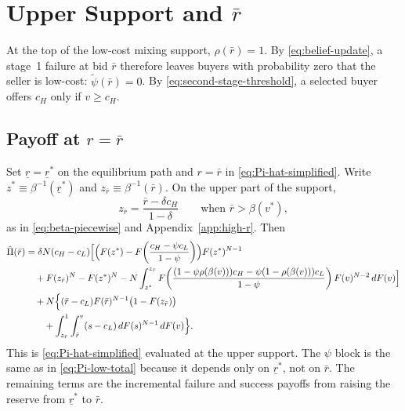 \section{Upper Support and \texorpdfstring{$\bar{r}$}{r bar}}
\label{sec:upper-support}

At the top of the low-cost mixing support, $\rho(\bar{r})=1$.
By \eqref{eq:belief-update}, a stage~1 failure at bid $\bar{r}$ therefore leaves
buyers with probability zero that the seller is low-cost:
$\tilde{\psi}(\bar{r})=0$.
By \eqref{eq:second-stage-threshold}, a selected buyer offers $c_H$ only if
$v\ge c_H$.

\subsection{Payoff at \texorpdfstring{$r=\bar{r}$}{r=bar r}}
\label{subsec:Pi-hat-bar}

Set $\underline{r}=\underline{r}^{*}$ on the equilibrium path and $r=\bar{r}$
in \eqref{eq:Pi-hat-simplified}.
Write
$z^{*}\equiv\beta^{-1}(\underline{r}^{*})$
and
$z_{\bar{r}}\equiv\beta^{-1}(\bar{r})$.
On the upper part of the support,
\begin{equation}
  z_{\bar{r}}
  = \frac{\bar{r}-\delta c_H}{1-\delta}
  \qquad\text{when }\bar{r}>\beta(v^{*}),
  \label{eq:z-bar}
\end{equation}
as in \eqref{eq:beta-piecewise} and Appendix~\ref{app:high-r}.
Then
\begin{align}
  \hat{\Pi}(\bar{r})
  &= \delta N (c_H - c_L)
    \Bigl[
      \Bigl(
        F(z^{*}) - F\!\left(\frac{c_H - \psi c_L}{1 - \psi}\right)
      \Bigr)
      F(z^{*})^{N-1}
    \notag \\
  &\quad + F(z_{\bar{r}})^{N}
      - F(z^{*})^{N}
      - N \int_{z^{*}}^{z_{\bar{r}}}
        F\!\left(
          \frac{
            (1 - \psi \rho(\beta(v))) c_H
            - \psi(1 - \rho(\beta(v))) c_L
          }{1 - \psi}
        \right)
        F(v)^{N-2}\, dF(v)
    \Bigr]
  \notag \\
  &\quad + N \Bigl\{
    (\bar{r} - c_L) F(\bar{r})^{N-1}
      \bigl(1 - F(z_{\bar{r}})\bigr)
    \notag \\
  &\qquad + \int_{z_{\bar{r}}}^{1}
      \int_{\bar{r}}^{v} (s - c_L)\, dF(s)^{N-1}
      \, dF(v)
  \Bigr\}.
  \label{eq:Pi-hat-bar}
\end{align}
This is \eqref{eq:Pi-hat-simplified} evaluated at the upper support.
The $\psi$ block is the same as in \eqref{eq:Pi-low-total} because it depends
only on $\underline{r}^{*}$, not on $\bar{r}$.
The remaining terms are the incremental failure and success payoffs from raising
the reserve from $\underline{r}^{*}$ to $\bar{r}$.

